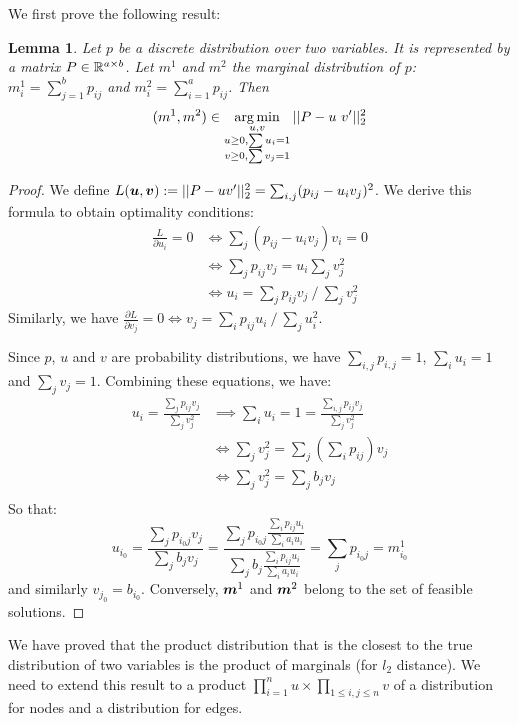 \documentclass{article} %
\theoremstyle{plain}
\newtheorem{lemma}[theorem]{Lemma}
\theoremstyle{definition}
\theoremstyle{remark}
\begin{document}
We first prove the following result: 
\begin{lemma}
Let $p$ be a discrete distribution over two variables. It is represented by a matrix $P \in \mathbb{R}^{a \times b}$. Let $m^1$ and $m^2$ the marginal distribution of $p$: $m^1_i = \sum_{j=1}^b p_{ij}$ and $m^2_i = \sum_{i=1}^a p_{ij}$.
Then
\[(m^1, m^2) \in \operatorname*{arg\,min}_{\substack{u, v \\ u \geq 0, \sum u_i = 1 \\ v \geq 0, \sum v_j = 1}} ||P -  u~ v'||_2^2 \]
\end{lemma}\vspace{-0.2cm}
\begin{proof}
We define  $L({\bm{u}}, {\bm{v}}) := ||P - u v'||_2^2 = \sum_{i, j} (p_{ij} - u_i v_j)^2 $. 
We derive this formula to obtain optimality conditions:
\begin{align*}
 \frac{L}{\partial u_i} = 0 &\iff \sum_j (p_{ij} - u_i v_j) v_i = 0 \\
 &\iff \sum_j p_{ij} v_j = u_i \sum_j v_j^2 \\
 &\iff u_i = \sum_j p_{ij} v_j ~/~ \sum_j v_j^2
 \end{align*}
Similarly, we have $\frac{\partial L}{\partial v_j} = 0 \iff v_j = \sum_i p_{ij} u_i ~/~ \sum_j u_i^2$.

Since $p$, $u$ and $v$ are probability distributions, we have  $\sum_{i, j} p_{i, j} = 1$, $\sum_i u_i = 1$ and $\sum_j v_j = 1$. 
Combining these equations, we have:
\begin{align*}
    u_i = \frac{\sum_j p_{ij} v_j}{\sum_j v_j^2} &\implies \sum_i u_i = 1 = \frac{\sum_{i,j} p_{ij} v_j}{\sum_j v_j^2} \\
    &\iff \sum_j v_j^2 = \sum_{j} (\sum_i p_{ij}) v_j \\
    &\iff \sum_j v_j^2 = \sum_{j} b_j v_j \\
\end{align*}\vspace{-0.5cm}
So that:
\[
    u_{i_0} = \frac{\sum_j p_{i_0j} v_j}{\sum_j b_j v_j}
            = \frac{\sum_j p_{i_0j} \frac{\sum_i p_{ij} u_i}{\sum_i a_i u_i}}{\sum_j b_j \frac{\sum_i p_{ij} u_i}{\sum_i a_i u_i}}
            = \sum_j p_{i_0j} = m^1_{i_0}
\]
and similarly $v_{j_0} = b_{i_0}$. Conversely, ${\bm{m}}^1$ and ${\bm{m}}^2$ belong to the set of feasible solutions.
\end{proof}

We have proved that the product distribution that is the closest to the true distribution of two variables is the product of marginals (for $l_2$ distance). We need to extend this result to a product $ \prod_{i=1}^n u \times \prod_{1 \leq i, j \leq n} v$ of a distribution for nodes and a distribution for edges. 
\end{document}
